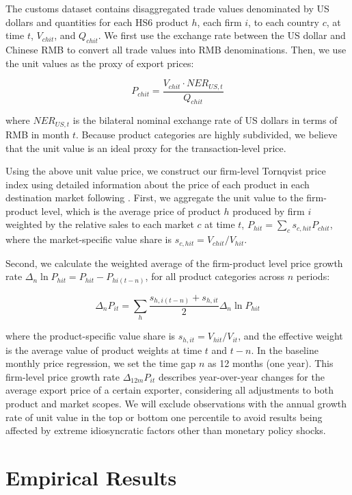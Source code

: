 The customs dataset contains disaggregated trade values denominated by US dollars and quantities for each HS6 product $h$, each firm $i$, to each country $c$, at time $t$, $V_{chit}$, and $Q_{chit}$. We first use the exchange rate between the US dollar and Chinese RMB to convert all trade values into RMB denominations. Then, we use the unit values as the proxy of export prices:

$$
P_{chit}=\frac{V_{chit}\cdot NER_{US,t}}{Q_{chit}}
$$

where $NER_{US,t}$ is the bilateral nominal exchange rate of US dollars in terms of RMB in month $t$. Because product categories are highly subdivided, we believe that the unit value is an ideal proxy for the transaction-level price. 

Using the above unit value price, we construct our firm-level Tornqvist price index using detailed information about the price of each product in each destination market following \cite{smeets2013estimating}. First, we aggregate the unit value to the firm-product level, which is the average price of product $h$ produced by firm $i$ weighted by the relative sales to each market $c$ at time $t$, $P_{hit}=\sum_c s_{c,hit} P_{chit}$, where the market-specific value share is $s_{c,hit}=V_{chit}/V_{hit}$. 

Second, we calculate the weighted average of the firm-product level price growth rate $\Delta_n \ln P_{hit} = P_{hit}- P_{hi(t-n)}$, for all product categories across $n$ periods: 

$$
\Delta_n P_{it} = \sum _{h} \frac{s_{h,i(t-n)}+s_{h,it}}{2} \Delta_n \ln P_{hit}
$$

where the product-specific value share is $s_{h,it}=V_{hit}/V_{it}$, and the effective weight is the average value of product weights at time $t$ and $t-n$. In the baseline monthly price regression, we set the time gap $n$ as 12 months (one year). This firm-level price growth rate $\Delta_{12m} P_{it}$ describes year-over-year changes for the average export price of a certain exporter, considering all adjustments to both product and market scopes. We will exclude observations with the annual growth rate of unit value in the top or bottom one percentile to avoid results being affected by extreme idiosyncratic factors other than monetary policy shocks.

\section{Empirical Results}

